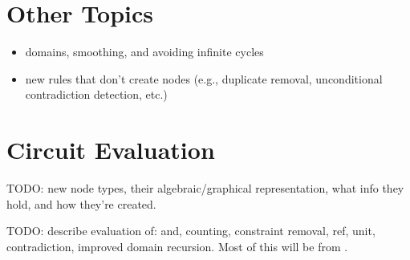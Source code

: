 \documentclass{article}
\theoremstyle{definition}
\begin{document}
\section{Other Topics}

\begin{itemize}
\item domains, smoothing, and avoiding infinite cycles
\item new rules that don't create nodes (e.g., duplicate removal, unconditional contradiction detection, etc.)
\end{itemize}

\section{Circuit Evaluation}

TODO: new node types, their algebraic/graphical representation, what info they hold, and how they're created.

TODO: describe evaluation of: and, counting, constraint removal, ref, unit, contradiction, improved domain recursion. Most of this will be from \cite{DBLP:conf/ijcai/BroeckTMDR11}.



\end{document}
